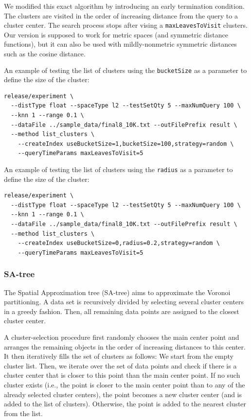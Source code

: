 \documentclass[runningheads,a4paper]{llncs}
\newcommand{\ttt}[1]{\texttt{#1}}
\begin{document}
{We modified this exact algorithm by introducing an early termination condition.
The clusters are visited in the order of increasing distance from
the query to a cluster center.
The search process stops after vising a \ttt{maxLeavesToVisit} clusters.
Our version is supposed to work for metric spaces (and symmetric distance functions),
but it can also be used with mildly-nonmetric symmetric distances such as the cosine distance.

An example of testing the list of clusters using the \ttt{bucketSize} as a parameter to define
the size of the cluster:
{
\footnotesize
\begin{verbatim}
release/experiment \
  --distType float --spaceType l2 --testSetQty 5 --maxNumQuery 100 \
  --knn 1 --range 0.1 \
  --dataFile ../sample_data/final8_10K.txt --outFilePrefix result \
  --method list_clusters \
    --createIndex useBucketSize=1,bucketSize=100,strategy=random \
    --queryTimeParams maxLeavesToVisit=5
\end{verbatim}
}
An example of testing the list of clusters using the \ttt{radius} as a parameter to define
the size of the cluster:
{
\footnotesize
\begin{verbatim}
release/experiment \
  --distType float --spaceType l2 --testSetQty 5 --maxNumQuery 100 \
  --knn 1 --range 0.1 \
  --dataFile ../sample_data/final8_10K.txt --outFilePrefix result \
  --method list_clusters \
    --createIndex useBucketSize=0,radius=0.2,strategy=random \
    --queryTimeParams maxLeavesToVisit=5
\end{verbatim}
}

\subsubsection{SA-tree}
The Spatial Approximation tree (SA-tree)  \cite{navarro2002searching} aims
to approximate the Voronoi partitioning.
A data set is recursively divided by selecting several cluster centers in a greedy fashion.
Then, all remaining data points are assigned to the closest cluster center.

A cluster-selection procedure first randomly chooses the main center point and arranges the
remaining objects in the order of increasing distances to this center.
It then iteratively fills the set of clusters as follows: We start from the empty cluster 
list. Then, we iterate over the set of data points and check if there is a cluster center that
is closer to this point than the main center point. 
If no such cluster exists (i.e., the point is closer to the main center point than to any
of the already selected cluster centers), the point becomes a new cluster center 
(and is added to the list of clusters).
Otherwise, the point is added to the nearest cluster from the list.

}
\end{document}
